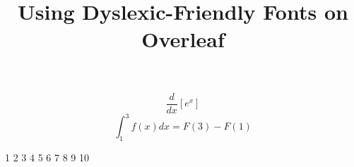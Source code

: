 \documentclass[12pt]{article}
\title{Using Dyslexic-Friendly Fonts on Overleaf}
\begin{document}
\lipsum[2]

\[ \frac{d}{dx}\left[ e^x \right] \]
\[ \int_1^3 f(x) dx = F(3)-F(1) \]

1 2 3 4 5 6 7 8 9 10
\end{document}
